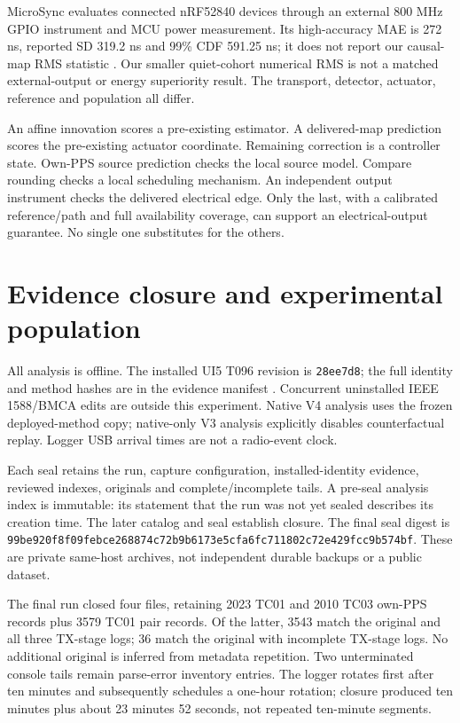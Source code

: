 \documentclass[11pt,letterpaper]{article}
\newcommand{\code}[1]{\texttt{\small #1}}
\begin{document}
MicroSync evaluates connected nRF52840 devices through an external 800 MHz GPIO instrument and MCU power measurement. Its high-accuracy MAE is 272 ns, reported SD 319.2 ns and 99\% CDF 591.25 ns; it does not report our causal-map RMS statistic \cite{micro}. Our smaller quiet-cohort numerical RMS is not a matched external-output or energy superiority result. The transport, detector, actuator, reference and population all differ.

An affine innovation scores a pre-existing estimator. A delivered-map prediction scores the pre-existing actuator coordinate. Remaining correction is a controller state. Own-PPS source prediction checks the local source model. Compare rounding checks a local scheduling mechanism. An independent output instrument checks the delivered electrical edge. Only the last, with a calibrated reference/path and full availability coverage, can support an electrical-output guarantee. No single one substitutes for the others.

\section{Evidence closure and experimental population}
All analysis is offline. The installed UI5 T096 revision is \code{28ee7d8}; the full identity and method hashes are in the evidence manifest \cite{evidence}. Concurrent uninstalled IEEE 1588/BMCA edits are outside this experiment. Native V4 analysis uses the frozen deployed-method copy; native-only V3 analysis explicitly disables counterfactual replay. Logger USB arrival times are not a radio-event clock.

Each seal retains the run, capture configuration, installed-identity evidence, reviewed indexes, originals and complete/incomplete tails. A pre-seal analysis index is immutable: its statement that the run was not yet sealed describes its creation time. The later catalog and seal establish closure. The final seal digest is \code{99be920f8f09febce268874c72b9b6173e5cfa6fc711802c72e429fcc9b574bf}. These are private same-host archives, not independent durable backups or a public dataset.

The final run closed four files, retaining 2023 TC01 and 2010 TC03 own-PPS records plus 3579 TC01 pair records. Of the latter, 3543 match the original and all three TX-stage logs; 36 match the original with incomplete TX-stage logs. No additional original is inferred from metadata repetition. Two unterminated console tails remain parse-error inventory entries. The logger rotates first after ten minutes and subsequently schedules a one-hour rotation; closure produced ten minutes plus about 23 minutes 52 seconds, not repeated ten-minute segments.
\end{document}
